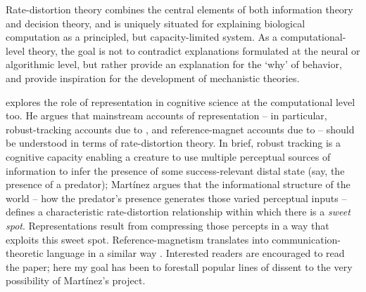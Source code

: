 \begin{myquote}
Rate-distortion theory combines the central elements of both information theory and decision theory, and is uniquely situated for explaining biological computation as a principled, but capacity-limited system. As a computational-level theory, the goal is not to contradict explanations formulated at the neural or algorithmic level, but rather provide an explanation for the `why' of behavior, and provide inspiration for the development of mechanistic theories.
\par\hspace*{\fill}\citet[193]{sims2016ratedistortion}
\end{myquote}

\citet{martinez2019representations} explores the role of representation in cognitive science at the computational level too.
He argues that mainstream accounts of representation -- in particular, robust-tracking accounts due to \citet{sterelny2003thought,burge2010origins}, and reference-magnet accounts due to \citet{ryder2004sinbad,lewis1984putnam} -- should be understood in terms of rate-distortion theory.
In brief, robust tracking is a cognitive capacity enabling a creature to use multiple perceptual sources of information to infer the presence of some success-relevant distal state (say, the presence of a predator); Mart\'{i}nez argues that the informational structure of the world -- how the predator's presence generates those varied perceptual inputs -- defines a characteristic rate-distortion relationship within which there is a \textit{sweet spot}.
Representations result from compressing those percepts in a way that exploits this sweet spot.
Reference-magnetism translates into communication-theoretic language in a similar way \citep[1223]{martinez2019representations}.
Interested readers are encouraged to read the paper; here my goal has been to forestall popular lines of dissent to the very possibility of Mart\'{i}nez's project.

